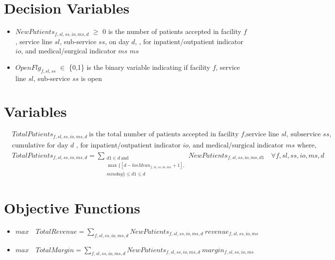 \documentclass[10pt, letterpaper]{article}
\begin{document}
\section*{Decision Variables}
\begin{itemize}
\item [ ] $NewPatients_{f,sl,ss,io,ms,d}$ $\geq$ {0} is the number of patients accepted in facility $f$, service line $sl$, sub-service $ss$, on day $d$, , for inpatient/outpatient indicator $io$, and medical/surgical indicator $ms$ $ms$
\item [ ] $OpenFlg_{f,sl,ss}$ $\in$ \{0,1\} is the binary variable indicating if facility $f$, service line $sl$, sub-service $ss$ is open
\end{itemize}

\section*{Variables}
\begin{align*}
&TotalPatients_{f,sl,ss,io,ms,d} \ \text{is the total number of patients accepted in facility $f$,service line $sl$, subservice $ss$,} \\
&\text{cumulative for day $d$ , for inpatient/outpatient indicator $io$, and medical/surgical indicator $ms$ where,} \\
&TotalPatients_{f,sl,ss,io,ms,d} =
\sum_{\substack{d1 \in d \ \text{and} \\
\max \{[d - losMean_{f,sl,ss,io,ms} + 1], \\ minday \} \leq d1 \leq d}} NewPatients_{f,sl,ss,io,ms,d1} \quad \forall f,sl,ss,io,ms,d\ 
\end{align*}
\pagebreak
\section*{Objective Functions}
\begin{itemize}
\item [ ] $max \quad TotalRevenue=\sum_{f,sl,ss,io,ms,d} NewPatients_{f,sl,ss,io,ms,d} \ revenue_{f,sl,ss,io,ms}$
\item [ ] $max \quad TotalMargin=\sum_{f,sl,ss,io,ms,d} NewPatients_{f,sl,ss,io,ms,d} \ margin_{f,sl,ss,io,ms}$
\end{itemize}
\end{document}
